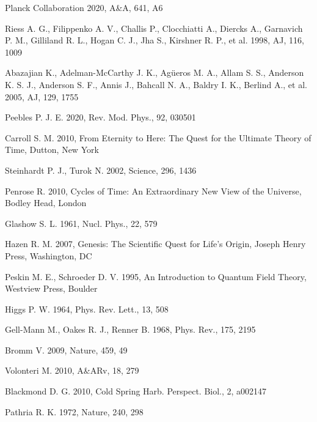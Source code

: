 \documentclass[a4paper,11pt]{article}
\begin{document}
\begin{thebibliography}{}

 Planck Collaboration 2020, A\&A, 641, A6

 Riess A. G., Filippenko A. V., Challis P., Clocchiatti A., Diercks A., Garnavich P. M., Gilliland R. L., Hogan C. J., Jha S., Kirshner R. P., et al. 1998, AJ, 116, 1009

 Abazajian K., Adelman-McCarthy J. K., Ag{\"u}eros M. A., Allam S. S., Anderson K. S. J., Anderson S. F., Annis J., Bahcall N. A., Baldry I. K., Berlind A., et al. 2005, AJ, 129, 1755

 Peebles P. J. E. 2020, Rev. Mod. Phys., 92, 030501

 Carroll S. M. 2010, From Eternity to Here: The Quest for the Ultimate Theory of Time, Dutton, New York

 Steinhardt P. J., Turok N. 2002, Science, 296, 1436

 Penrose R. 2010, Cycles of Time: An Extraordinary New View of the Universe, Bodley Head, London

 Glashow S. L. 1961, Nucl. Phys., 22, 579

 Hazen R. M. 2007, Genesis: The Scientific Quest for Life's Origin, Joseph Henry Press, Washington, DC

 Peskin M. E., Schroeder D. V. 1995, An Introduction to Quantum Field Theory, Westview Press, Boulder

 Higgs P. W. 1964, Phys. Rev. Lett., 13, 508

 Gell-Mann M., Oakes R. J., Renner B. 1968, Phys. Rev., 175, 2195

 Bromm V. 2009, Nature, 459, 49

 Volonteri M. 2010, A\&ARv, 18, 279

 Blackmond D. G. 2010, Cold Spring Harb. Perspect. Biol., 2, a002147

 Pathria R. K. 1972, Nature, 240, 298


\end{thebibliography}
\end{document}
